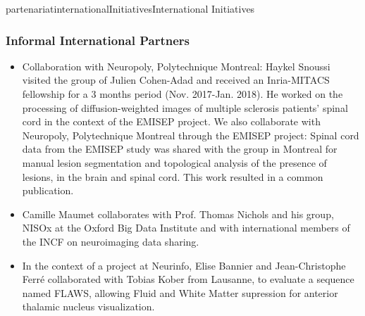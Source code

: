 \documentclass{ra2018}
\begin{document}
\begin{module}{partenariat}{internationalInitiatives}{International Initiatives}
        \subsubsection{Informal International Partners}
        

\begin{itemize}
    \item Collaboration with Neuropoly, Polytechnique Montreal: Haykel Snoussi visited the group of Julien Cohen-Adad and received an Inria-MITACS fellowship for a 3 months period (Nov. 2017-Jan. 2018). He worked on the processing of diffusion-weighted images of multiple sclerosis patients' spinal cord in the context of the EMISEP project. We also collaborate with Neuropoly, Polytechnique Montreal through the EMISEP project: Spinal cord data from the EMISEP study was shared with the group in Montreal for manual lesion segmentation and topological analysis of the presence of lesions, in the brain and spinal cord. This work resulted in a common publication. 
    \item Camille Maumet collaborates with Prof. Thomas Nichols and his group, NISOx at the Oxford Big Data Institute and with international members of the INCF on neuroimaging data sharing.
    \item In the context of a project at Neurinfo, Elise Bannier and Jean-Christophe Ferré collaborated with Tobias Kober from Lausanne, to evaluate a sequence named FLAWS, allowing Fluid and White Matter supression for anterior thalamic nucleus visualization. 
\end{itemize}






\end{module}
\end{document}
